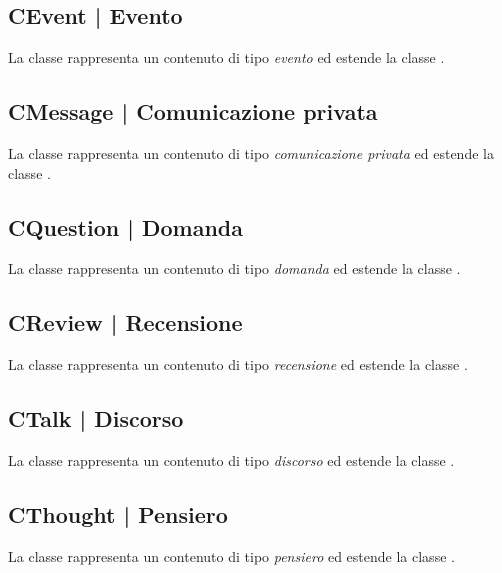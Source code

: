 \documentclass[10pt,a4paper,headinclude,footinclude,hidelinks]{scrreprt} %
\begin{document}
	\subsection[CEvent]{CEvent | Evento}
	\label{sec:stage:design:sistema:model:event}
	La classe rappresenta un contenuto di tipo \textit{evento} ed estende la classe \textit{}.

	\subsection[CMessage]{CMessage | Comunicazione privata}
	\label{sec:stage:design:sistema:model:message}
	La classe rappresenta un contenuto di tipo \textit{comunicazione privata} ed estende la classe \textit{}.

	\subsection[CQuestion]{CQuestion | Domanda}
	\label{sec:stage:design:sistema:model:question}
	La classe rappresenta un contenuto di tipo \textit{domanda} ed estende la classe \textit{}.

	\subsection[CReview]{CReview | Recensione}
	\label{sec:stage:design:sistema:model:review}
	La classe rappresenta un contenuto di tipo \textit{recensione} ed estende la classe \textit{}.

	\subsection[CTalk]{CTalk | Discorso}
	\label{sec:stage:design:sistema:model:talk}
	La classe rappresenta un contenuto di tipo \textit{discorso} ed estende la classe \textit{}.

	\subsection[CThought]{CThought | Pensiero}
	\label{sec:stage:design:sistema:model:thought}
	La classe rappresenta un contenuto di tipo \textit{pensiero} ed estende la classe \textit{}.
\end{document}
